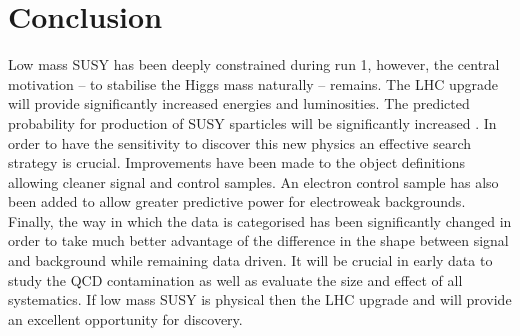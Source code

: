 
\chapter{Conclusion} %

\label{Chapter7} %



Low mass SUSY has been deeply constrained during run 1, however, 
the central motivation -- to stabilise the Higgs mass naturally -- remains. 
The LHC upgrade will provide significantly increased energies and luminosities. The predicted 
probability for production of SUSY sparticles will be significantly 
increased  \cite{ProjectedCx}. In order to have the sensitivity to discover this new physics 
an effective search strategy is crucial. Improvements have been 
made to the object definitions allowing cleaner signal and control
samples. An electron control sample has also been added to allow
greater predictive power for electroweak backgrounds. Finally, the way in which
the data is categorised has been significantly changed in order to take much better
advantage of the difference in the \mht shape between signal and
background while remaining data driven. It will be crucial in early data to study the QCD contamination as well as evaluate the size and effect of all systematics. If low mass SUSY is physical then 
the LHC upgrade and \alphat will provide an excellent opportunity for discovery. 



